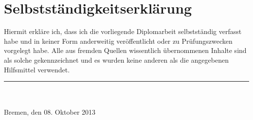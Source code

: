 \chapter*{Selbstst\"andigkeitserkl\"arung}

Hiermit erkl\"are ich, dass ich die vorliegende Diplomarbeit selbstst\"andig verfasst habe und in keiner Form anderweitig ver\"offentlicht oder zu Pr\"ufungszwecken vorgelegt habe. Alle aus fremden Quellen wissentlich \"ubernommenen Inhalte sind als solche gekennzeichnet und es wurden keine anderen als die angegebenen Hilfsmittel verwendet.

\vspace*{3em}
\rule{20em}{0.16667pt}\\
\makeatletter\@author\makeatother\\
Bremen, den 08. Oktober 2013
